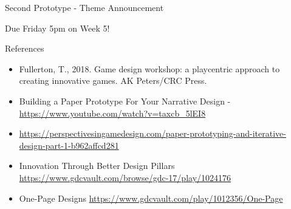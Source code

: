 


\begin{frame}{Second Prototype - Theme Announcement}
\begin{center}
	\Huge{Due Friday 5pm on Week 5!}
\end{center}
\end{frame}

\begin{frame}{References}
	\begin{itemize}
		\item Fullerton, T., 2018. Game design workshop: a playcentric approach to creating innovative games. AK Peters/CRC Press.
		\item Building a Paper Prototype For Your Narrative Design - \url{https://www.youtube.com/watch?v=taxcb_5lEI8}
		\item \url{https://perspectivesingamedesign.com/paper-prototyping-and-iterative-design-part-1-b962affcd281}
	\end{itemize}
\end{frame}

\begin{frame}
	\begin{itemize}
		\item Innovation Through Better Design Pillars \url{https://www.gdcvault.com/browse/gdc-17/play/1024176}
		\item One-Page Designs \url{https://www.gdcvault.com/play/1012356/One-Page}	
	\end{itemize}
\end{frame}


